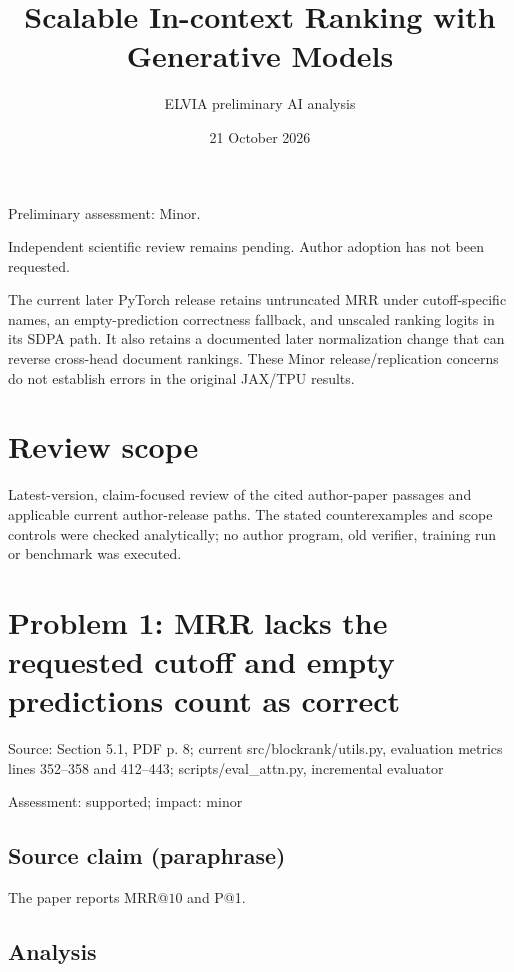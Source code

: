 \documentclass[11pt]{article}
\begin{document}
\title{Scalable In-context Ranking with Generative Models}

\author{ELVIA preliminary AI analysis}\date{21 October 2026}\maketitle

Preliminary assessment: Minor.\par

Independent scientific review remains pending. Author adoption has not been requested.

The current later PyTorch release retains untruncated MRR under cutoff-specific names, an empty-prediction correctness fallback, and unscaled ranking logits in its SDPA path. It also retains a documented later normalization change that can reverse cross-head document rankings. These Minor release/replication concerns do not establish errors in the original JAX/TPU results.

\section*{Review scope}

Latest-version, claim-focused review of the cited author-paper passages and applicable current author-release paths. The stated counterexamples and scope controls were checked analytically; no author program, old verifier, training run or benchmark was executed.

\section*{Problem 1: MRR lacks the requested cutoff and empty predictions count as correct}

Source: Section 5.1, PDF p. 8; current src/blockrank/utils.py, evaluation metrics lines 352–358 and 412–443; scripts/eval\_attn.py, incremental evaluator

Assessment: supported; impact: minor

\subsection*{Source claim (paraphrase)}

The paper reports MRR@\(10\) and P@1.

\subsection*{Analysis}
\end{document}
